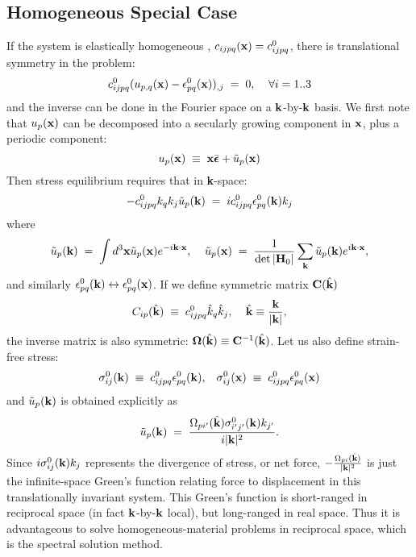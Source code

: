 \documentclass[12pt]{article}
\def\bmath#1{\mbox{\boldmath$#1$}}
\begin{document}
\subsection{Homogeneous Special Case}
\label{sec:HomogeneousSpecialCase}

If the system is elastically homogeneous \cite{WangJK02}, 
$c_{ijpq}({\bf x})=c_{ijpq}^0$, there is
translational symmetry in the problem:
\begin{equation}
 c_{ijpq}^0 ( 
  u_{p,q}({\bf x}) - \epsilon^0_{pq}({\bf x}) )_{,j} \;=\; 0, 
  \;\;\;\;
  \forall i=1..3
\end{equation}
and the inverse can be done in the Fourier space on a ${\bf
k}$-by-${\bf k}$ basis.  We first note that $u_p({\bf x})$ can be
decomposed into a secularly growing component in ${\bf x}$, plus a
periodic component:
\begin{equation}
 u_p({\bf x}) \;\equiv\; {\bf x}\bar{\bmath{\epsilon}} + \tilde{u}_p({\bf x})
\end{equation}
Then stress equilibrium requires that in {\bf k}-space:
\begin{equation}
  -c_{ijpq}^0 k_qk_j \tilde{u}_p({\bf k}) \;=\; 
  ic_{ijpq}^0\epsilon^0_{pq}({\bf k}) k_j
\end{equation}
where 
\begin{equation}
 \tilde{u}_p({\bf k}) \;=\; 
 \int d^3{\bf x} \tilde{u}_p({\bf x})e^{-i{\bf k}\cdot {\bf x}},
 \;\;\;\;
 \tilde{u}_p({\bf x}) \;=\; \frac{1}{\det|{\bf H}_0|}
 \sum_{{\bf k}} \tilde{u}_p({\bf k})e^{i{\bf k}\cdot {\bf x}},
\end{equation}
and similarly $\epsilon^0_{pq}({\bf
k})\leftrightarrow\epsilon^0_{pq}({\bf x})$.  If we define 
symmetric matrix ${\bf C}(\hat{\bf k})$
\cite{WangJK02}
\begin{equation}
 C_{ip}(\hat{\bf k}) \;\equiv\; c_{ijpq}^0 \hat{k}_q\hat{k}_j, \;\;\;\;
 \hat{\bf k}\equiv \frac{{\bf k}}{|{\bf k}|},
 \label{C_Definition}
\end{equation}
the inverse matrix is also symmetric: ${\bf \Omega}(\hat{\bf k})\equiv
{\bf C}^{-1}(\hat{\bf k})$.  Let us also define strain-free stress:
\begin{equation}
 \sigma^0_{ij}({\bf k}) \;\equiv\; c_{ijpq}^0\epsilon^0_{pq}({\bf k}), \;\;\;
 \sigma^0_{ij}({\bf x}) \;\equiv\; c_{ijpq}^0\epsilon^0_{pq}({\bf x})
\end{equation}
and $\tilde{u}_p({\bf k})$ is obtained
explicitly as 
\begin{equation}
 \tilde{u}_p({\bf k}) \;=\; 
 \frac{\Omega_{pi'}(\hat{\bf k})\sigma^0_{i'j'}({\bf k}) k_{j'}}
 {i|{\bf k}|^2}.
 \label{DisplacementHomogeneousSolution}
\end{equation}
Since $i\sigma^0_{ij}({\bf k}) k_j$ represents the divergence of
stress, or net force, $-\frac{\Omega_{pi}(\hat{\bf k})}{|{\bf k}|^2}$
is just the infinite-space Green's function relating force to
displacement in this translationally invariant system.  This Green's
function is short-ranged in reciprocal space (in fact ${\bf
k}$-by-${\bf k}$ local), but long-ranged in real space.  Thus it is
advantageous to solve homogeneous-material problems in reciprocal
space, which is the spectral solution method.
\end{document}
